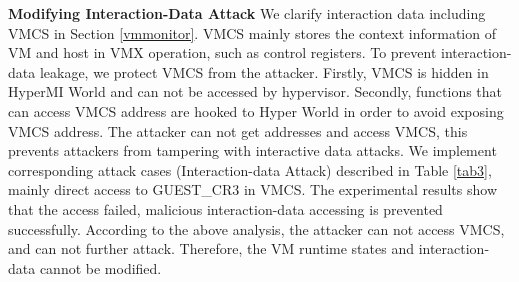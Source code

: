 \documentclass[conference]{IEEEtran}
\begin{document}
\textbf{Modifying Interaction-Data Attack}
We clarify interaction data including VMCS in Section \ref{vmmonitor}. VMCS mainly stores the context information of VM and host in VMX operation, such as control registers. To prevent interaction-data leakage, we protect VMCS from the attacker. Firstly, VMCS is hidden in HyperMI World and can not be accessed by hypervisor. Secondly, functions that can access VMCS address are hooked to Hyper World in order to avoid exposing VMCS address. The attacker can not get addresses and access VMCS, this prevents attackers from tampering with interactive data attacks. We implement corresponding attack cases (Interaction-data Attack) described in Table \ref{tab3}, mainly direct access to GUEST\_CR3 in VMCS. The experimental results show that the access failed, malicious interaction-data accessing is prevented successfully. According to the above analysis, the attacker can not access VMCS, and can not further attack. Therefore, the VM runtime states and interaction-data cannot be modified. 


\end{document}
